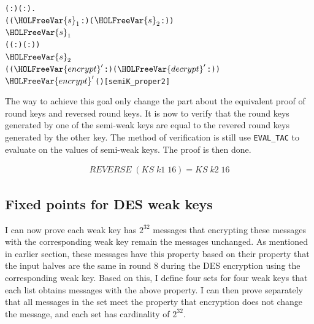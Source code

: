 \documentclass{article}
\begin{document}
\begin{alltt}
\HOLTokenTurnstile{} \HOLSymConst{\HOLTokenForall{}}( :) ( : \HOLTokenProd{} ).
        \HOLSymConst{\HOLTokenConj{}}  \HOLSymConst{=} ((\ensuremath{\HOLFreeVar{s}\sb{\mathrm{1}}} :)\HOLSymConst{,}(\ensuremath{\HOLFreeVar{s}\sb{\mathrm{2}}} :)) \HOLSymConst{\HOLTokenConj{}}
      \ensuremath{\HOLFreeVar{s}\sb{\mathrm{1}}} \HOLSymConst{=}
     (( : \HOLTokenMap{} )\HOLSymConst{,}( : \HOLTokenMap{} )) \HOLSymConst{\HOLTokenConj{}}
      \ensuremath{\HOLFreeVar{s}\sb{\mathrm{2}}} \HOLSymConst{=}
     ((\ensuremath{\HOLFreeVar{encrypt}\sp{\prime{}}} : \HOLTokenMap{} )\HOLSymConst{,}(\ensuremath{\HOLFreeVar{decrypt}\sp{\prime{}}} : \HOLTokenMap{} )) \HOLSymConst{\HOLTokenImp{}}
     \ensuremath{\HOLFreeVar{encrypt}\sp{\prime{}}} ( ) \HOLSymConst{=} \hfill{[semiK_proper2]}
\end{alltt}

The way to achieve this goal only change the part about the equivalent proof of round keys and reversed round keys.
It is now to verify that the round keys generated by one of the semi-weak keys are equal to the revered round
keys generated by the other key. The method of verification is still use \verb|EVAL_TAC| to evaluate on the values of semi-weak
keys. The proof is then done.

\begin{equation*}
\begin{split}
 REVERSE \; (KS \; k1 \; 16)= KS \; k2 \; 16
\end{split}
\end{equation*}

\subsection{Fixed points for DES weak keys}
I can now prove each weak key has $2^{32}$ messages that encrypting these messages with the corresponding weak key remain
the messages unchanged. As mentioned in earlier section, these messages have this property based on their property that
the input halves are the same in round 8 during the DES encryption using the corresponding weak key. Based on this, I define
four sets for four weak keys that each list obtains messages with the above property. I can then prove separately that
all messages in the set meet the property that encryption does not change the message, and each set has cardinality
of $2^{32}$.
\end{document}
